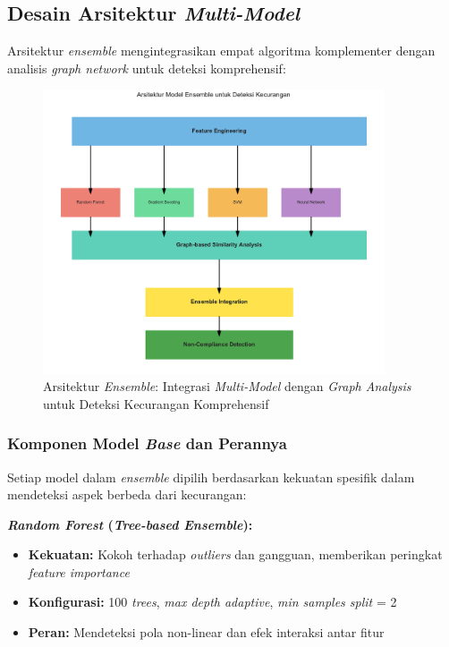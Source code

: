 \subsection{Desain Arsitektur \textit{Multi-Model}}
\label{subsec:desainArsitektur}

Arsitektur \textit{ensemble} mengintegrasikan empat algoritma komplementer dengan analisis \textit{graph network} untuk deteksi komprehensif:

\begin{figure}[htbp]
    \centering
    \includegraphics[width=0.9\textwidth]{figures/ensemble_architecture.pdf}
    \caption{Arsitektur \textit{Ensemble}: Integrasi \textit{Multi-Model} dengan \textit{Graph Analysis} untuk Deteksi Kecurangan Komprehensif}
    \label{fig:ensemble_architecture_detail}
\end{figure}

\subsubsection{Komponen Model \textit{Base} dan Perannya}
\label{sec:komponenModelBase}

Setiap model dalam \textit{ensemble} dipilih berdasarkan kekuatan spesifik dalam mendeteksi aspek berbeda dari kecurangan:

\textbf{\textit{Random Forest} (\textit{Tree-based Ensemble}):}
\begin{itemize}
    \item \textbf{Kekuatan:} Kokoh terhadap \textit{outliers} dan gangguan, memberikan peringkat \textit{feature importance}
    \item \textbf{Konfigurasi:} 100 \textit{trees}, \textit{max depth adaptive}, \textit{min samples split} = 2
    \item \textbf{Peran:} Mendeteksi pola non-linear dan efek interaksi antar fitur
\end{itemize}

